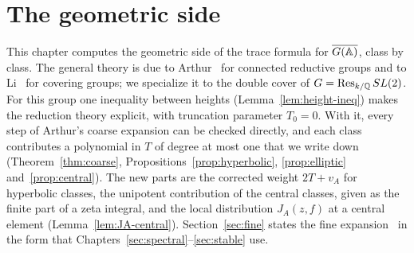 %
%

\providecommand{\GA}{\overline{G(\A)}}

\chapter{The geometric side}\label{sec:geometric}

This chapter computes the geometric side of the trace formula for
$\GA$, class by class. The general theory is due to
Arthur~\cite{Ar78,Ar80,Ar86} for connected reductive groups and to
Li~\cite{Li14a} for covering groups; we specialize it to the double cover of
$G=\operatorname{Res}_{k/\mathbb{Q}}SL(2)$. For this group one inequality between heights
(Lemma~\ref{lem:height-ineq}) makes the reduction theory explicit, with
truncation parameter $T_0=0$. With it, every step of Arthur's coarse
expansion can be checked directly, and each class contributes a
polynomial in $T$ of degree at most one that we write down
(Theorem~\ref{thm:coarse}, Propositions~\ref{prop:hyperbolic},
\ref{prop:elliptic} and~\ref{prop:central}). The new parts are the
corrected weight $2T+v_A$ for hyperbolic classes, the unipotent
contribution of the central classes, given as the finite part of a zeta
integral, and the local distribution $J_A(z,f)$ at a central element
(Lemma~\ref{lem:JA-central}). Section~\ref{sec:fine} states the fine
expansion~\cite{Ar86,Li14a} in the form that Chapters~\ref{sec:spectral}--\ref{sec:stable} use.

